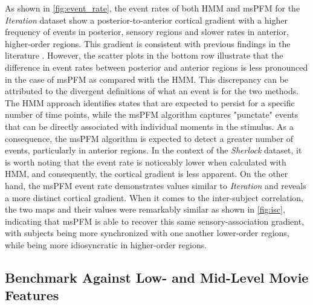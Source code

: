As shown in \cref{fig:event_rate}, the event rates of both HMM and msPFM for the
\textit{Iteration} dataset show a posterior-to-anterior cortical gradient with a
higher frequency of events in posterior, sensory regions and slower rates in
anterior, higher-order regions. This gradient is consistent with previous
findings in the literature \citep{SavaSegal2022Individualvariabilityneural}.
However, the scatter plots in the bottom row illustrate that the difference in
event rates between posterior and anterior regions is less pronounced in the
case of msPFM as compared with the HMM. This discrepancy can be attributed to
the divergent definitions of what an event is for the two methods. The HMM
approach identifies states that are expected to persist for a specific number of
time points, while the msPFM algorithm captures "punctate" events that can be
directly associated with individual moments in the stimulus. As a consequence,
the msPFM algorithm is expected to detect a greater number of events,
particularly in anterior regions. In the context of the \textit{Sherlock}
dataset, it is worth noting that the event rate is noticeably lower when
calculated with HMM, and consequently, the cortical gradient is less apparent.
On the other hand, the msPFM event rate demonstrates values similar to
\textit{Iteration} and reveals a more distinct cortical gradient. When it comes
to the inter-subject correlation, the two maps and their values were remarkably
similar as shown in \cref{fig:isc}, indicating that msPFM is able to recover
this same sensory-association gradient, with subjects being more synchronized
with one another lower-order regions, while being more idiosyncratic in
higher-order regions.

\subsection{Benchmark Against Low- and Mid-Level Movie Features}

